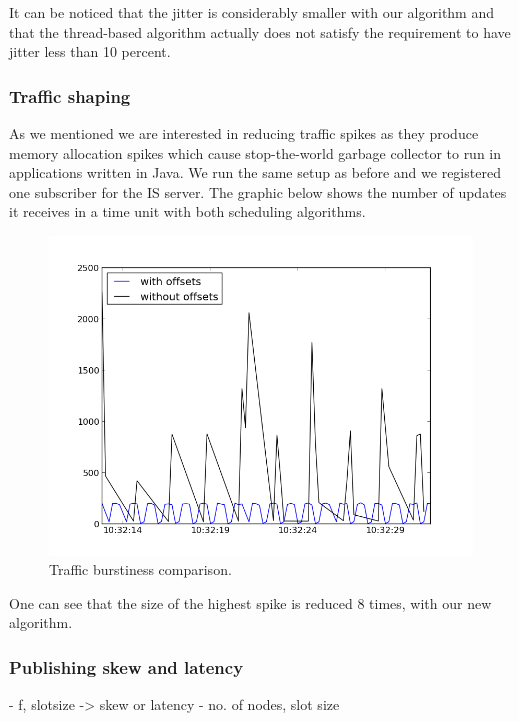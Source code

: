 It can be noticed that the jitter is considerably smaller with our algorithm and that the thread-based algorithm actually does not satisfy the requirement to have jitter less than 10 percent.

\subsubsection*{Traffic shaping}

As we mentioned we are interested in reducing traffic spikes as they produce memory allocation spikes which cause stop-the-world garbage collector to run in applications written in Java. We run the same setup as before and we registered one subscriber for the IS server. The graphic below shows the number of updates it receives in a time unit with both scheduling algorithms. 

\begin{figure}[H]
\centering
\includegraphics[scale=0.6]{Images/burstiness.png}
\caption{Traffic burstiness comparison.}
\end{figure}

One can see that the size of the highest spike is reduced 8 times, with our new algorithm.

\subsubsection*{Publishing skew and latency}
- f, slotsize -> skew or latency
- no. of nodes, slot size


